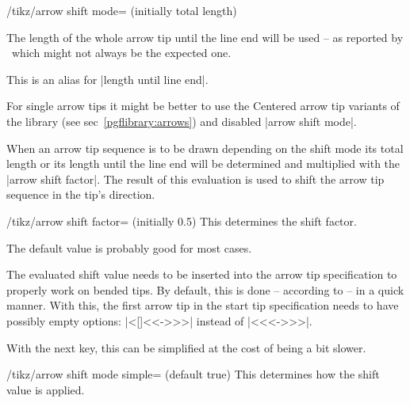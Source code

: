 \begin{multicols}{2}
\begin{key}{/tikz/arrow shift mode= (initially total length)}
\begin{description}
  The length of the whole arrow tip until the line end will be used --
  as reported by \pgfname\ which might not always be the expected one.
\item[|arrow shift mode|=\declare{|line end|}]

  This is an alias for |length until line end|.
\begin{codeexample}[preamble=\usetikzlibrary{ext.arrows-plus}]
\end{codeexample}
\end{description}

For single arrow tips it might be better to use the Centered arrow tip variants
of the  library (see sec~\ref{pgflibrary:arrows})
and disabled |arrow shift mode|.
\end{key}

When an arrow tip sequence is to be drawn depending on the shift mode
its total length or its length until the line end will be determined
and multiplied with the |arrow shift factor|.
The result of this evaluation is used to shift the arrow tip sequence
in the tip's direction.

\begin{key}{/tikz/arrow shift factor= (initially 0.5)}
  This determines the shift factor.
  
  The default value is probably good for most cases.
\end{key}

The evaluated shift value needs to be inserted into the arrow tip specification
to properly work on bended tips.
By default, this is done -- according to \cite[p.~208]{pgfmanual} --
in a quick manner.
With this, the first arrow tip in the start tip specification
needs to have possibly empty options: |<[]<<->>>| instead of |<<<->>>|.

With the next key, this can be simplified at the cost of being a bit slower.
\begin{key}{/tikz/arrow shift mode simple= (default true)}
  This determines how the shift value is applied.


\end{key}
\end{multicols}
